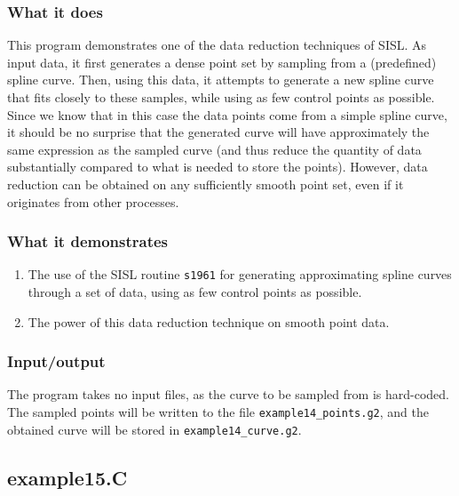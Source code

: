\subsubsection{What it does}
This program demonstrates one of the data reduction techniques of SISL.  As input data, it first
generates a dense point set by sampling from a (predefined) spline curve.  Then, using this
data, it attempts to generate a new spline curve that fits closely to these samples, while using 
as few control points as possible.  Since we know that in this case the data points come from
a simple spline curve, it should be no surprise that the generated curve will have approximately
the same expression as the sampled curve (and thus reduce the quantity of data substantially
compared to what is needed to store the points).  However, data reduction can be obtained on any
sufficiently smooth point set, even if it originates from other processes.

\subsubsection{What it demonstrates}
\begin{enumerate}
\item The use of the SISL routine \verb/s1961/ for generating approximating spline curves through
a set of data, using as few control points as possible.
\item The power of this data reduction technique on smooth point data.
\end{enumerate}
\subsubsection{Input/output}
The program takes no input files, as the curve to be sampled from is hard-coded.  \\
The sampled points will be written to the file \verb/example14_points.g2/, and the obtained
curve will be stored in \verb/example14_curve.g2/.

\subsection{example15.C}

